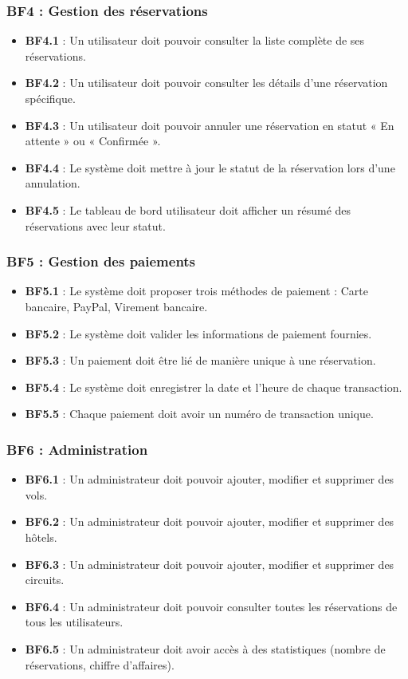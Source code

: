 \documentclass[12pt,a4paper]{report}
\begin{document}
\subsubsection{BF4 : Gestion des réservations}

\begin{itemize}
    \item \textbf{BF4.1} : Un utilisateur doit pouvoir consulter la liste complète de ses réservations.
    \item \textbf{BF4.2} : Un utilisateur doit pouvoir consulter les détails d'une réservation spécifique.
    \item \textbf{BF4.3} : Un utilisateur doit pouvoir annuler une réservation en statut « En attente » ou « Confirmée ».
    \item \textbf{BF4.4} : Le système doit mettre à jour le statut de la réservation lors d'une annulation.
    \item \textbf{BF4.5} : Le tableau de bord utilisateur doit afficher un résumé des réservations avec leur statut.
\end{itemize}

\subsubsection{BF5 : Gestion des paiements}

\begin{itemize}
    \item \textbf{BF5.1} : Le système doit proposer trois méthodes de paiement : Carte bancaire, PayPal, Virement bancaire.
    \item \textbf{BF5.2} : Le système doit valider les informations de paiement fournies.
    \item \textbf{BF5.3} : Un paiement doit être lié de manière unique à une réservation.
    \item \textbf{BF5.4} : Le système doit enregistrer la date et l'heure de chaque transaction.
    \item \textbf{BF5.5} : Chaque paiement doit avoir un numéro de transaction unique.
\end{itemize}

\subsubsection{BF6 : Administration}

\begin{itemize}
    \item \textbf{BF6.1} : Un administrateur doit pouvoir ajouter, modifier et supprimer des vols.
    \item \textbf{BF6.2} : Un administrateur doit pouvoir ajouter, modifier et supprimer des hôtels.
    \item \textbf{BF6.3} : Un administrateur doit pouvoir ajouter, modifier et supprimer des circuits.
    \item \textbf{BF6.4} : Un administrateur doit pouvoir consulter toutes les réservations de tous les utilisateurs.
    \item \textbf{BF6.5} : Un administrateur doit avoir accès à des statistiques (nombre de réservations, chiffre d'affaires).
\end{itemize}
\end{document}
